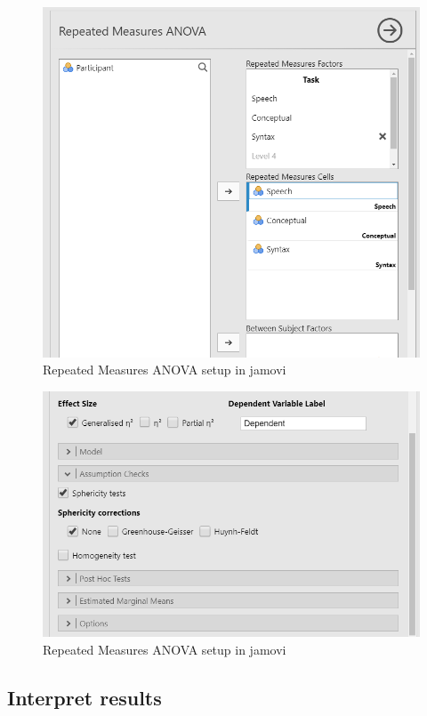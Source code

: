 \documentclass[
]{book}
\begin{document}
\begin{figure}

{\centering \includegraphics[width=0.8\linewidth]{images/05-repeated-measures-anova/rm-anova_setup1} 

}

\caption{Repeated Measures ANOVA setup in jamovi}\label{fig:unnamed-chunk-4}
\end{figure}

\begin{figure}

{\centering \includegraphics[width=0.8\linewidth]{images/05-repeated-measures-anova/rm-anova_setup2} 

}

\caption{Repeated Measures ANOVA setup in jamovi}\label{fig:unnamed-chunk-5}
\end{figure}

\hypertarget{interpret-results-5}{%
\subsection{Interpret results}\label{interpret-results-5}}
\end{document}
